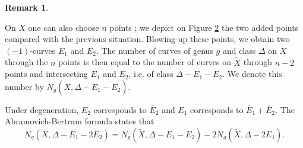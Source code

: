 \documentclass[11pt]{article}
\theoremstyle{definition}
\newtheorem{rema}[theo]{Remark}
\numberwithin{equation}{section}
\theoremstyle{plain}
\begin{document}
\begin{rema}
\begin{figure}[ht]
	\caption{}
	\label{fig-blowupXtan}
\end{figure}
 

On $X$ one can also choose $n$ points ; we depict on Figure \ref{fig-blowupXpoint} the two added points compared with the previous situation. Blowing-up these points, we obtain two $(-1)$-curves $E_1$ and $E_2$. The number of curves of genus $g$ and class $\Delta$ on $X$ through the $n$ points is then equal to the number of curves on $\widetilde X$ through $n-2$ points and intersecting $E_1$ and $E_2$, i.e.  of class $\Delta-E_1-E_2$. We denote this number by $N_g(\widetilde X,\Delta-E_1-E_2)$. 
 

\begin{figure}[ht]
	\centering
{}
	\caption{}
	\label{fig-blowupXpoint}
\end{figure}

Under degeneration, $E_2$ corresponds to $\overline E_2$ and $E_1$ corresponds to $\overline E_1 + \overline E_2$. The Abramovich-Bertram formula \cite{abramovich-2001-formula, vakil-2000-counting, brugalle-2020-invariance, bousseau_refined_2021} states that
\[ N_g(\overline X, \Delta-\overline E_1 -2\overline E_2) = N_g(\widetilde X, \Delta-E_1-E_2) -2 N_g(\widetilde X,\Delta-2E_1) .\]


\end{rema}
\end{document}
